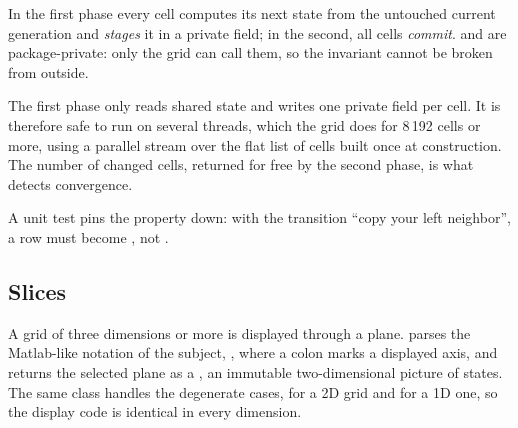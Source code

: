 In the first phase every cell computes its next state from the untouched current generation and
\emph{stages} it in a private field; in the second, all cells \emph{commit}.  and
 are package-private: only the grid can call them, so the invariant cannot be broken
from outside.

The first phase only reads shared state and writes one private field per cell. It is therefore
safe to run on several threads, which the grid does for 8\,192 cells or more, using a parallel
stream over the flat list of cells built once at construction. The number of changed cells,
returned for free by the second phase, is what detects convergence.

A unit test pins the property down: with the transition ``copy your left neighbor'', a row
 must become , not .

\subsection{Slices}

A grid of three dimensions or more is displayed through a plane.  parses the
Matlab-like notation of the subject, , where a colon marks a displayed axis, and
 returns the selected plane as a , an immutable two-dimensional
picture of states. The same class handles the degenerate cases, \code{(:, :)} for a 2D grid and
\code{(:)} for a 1D one, so the display code is identical in every dimension.

